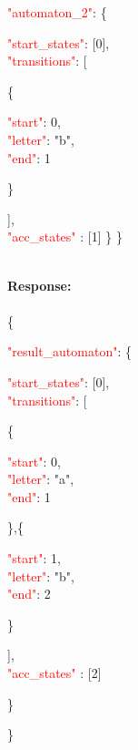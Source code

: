    \begin{adjustwidth}{7.5 mm}{0 cm}

   \textcolor{red}{"automaton\_2"}: \{
     \begin{adjustwidth}{7.5 mm}{0 cm}
            \textcolor{red}{"start\_states"}: [0],\\
            \textcolor{red}{"transitions"}: [
            \begin{adjustwidth}{7.5 mm}{0 cm}
            \{
               \begin{adjustwidth}{7.5 mm}{0 cm}
                    \textcolor{red}{"start"}: 0,\\
                    \textcolor{red}{"letter"}: "b",\\
                    \textcolor{red}{"end"}: 1
               \end{adjustwidth}
            \}
            \end{adjustwidth}
            ],\\
        \textcolor{red}{"acc\_states" }: [1]  \} \}
    \end{adjustwidth}
\end{adjustwidth}
\ \\
\textbf{Response:}\\
\ \\
 \{
 \begin{adjustwidth}{7.5 mm}{0 cm}
    \textcolor{red}{"result\_automaton"}: \{
        \begin{adjustwidth}{7.5 mm}{0 cm}
            \textcolor{red}{"start\_states"}: [0],\\
            \textcolor{red}{"transitions"}: [
            \begin{adjustwidth}{7.5 mm}{0 cm}
            \{
               \begin{adjustwidth}{7.5 mm}{0 cm}
                    \textcolor{red}{"start"}: 0,\\
                    \textcolor{red}{"letter"}: "a",\\
                    \textcolor{red}{"end"}: 1
               \end{adjustwidth}
            \},\{
               \begin{adjustwidth}{7.5 mm}{0 cm}
                    \textcolor{red}{"start"}: 1,\\
                    \textcolor{red}{"letter"}: "b",\\
                    \textcolor{red}{"end"}: 2
               \end{adjustwidth}
            \}
            \end{adjustwidth}
            ],\\
        \textcolor{red}{"acc\_states" }: [2]
    \end{adjustwidth}
    \}
\end{adjustwidth}
\}

